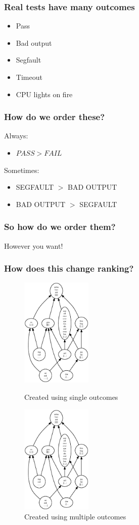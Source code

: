 \documentclass[svgnames]{beamer}
\newcommand\fail{\mathit{FAIL}}
\newcommand\pass{\mathit{PASS}}
\theoremstyle{definition}
\begin{document}
\begin{frame}
\frametitle{Real tests have many outcomes}
\begin{itemize}
\item Pass
\item Bad output
\item Segfault
\item Timeout
\item CPU lights on fire
\end{itemize}
\end{frame}

\begin{frame}
\frametitle{How do we order these?}
Always:
\begin{itemize}
\item $\pass>\fail$
\end{itemize}
Sometimes:
\begin{itemize}
\item SEGFAULT $>$ BAD OUTPUT
\item BAD OUTPUT $>$ SEGFAULT
\end{itemize}
\end{frame}

\begin{frame}
\frametitle{So how do we order them?}
However you want!
\end{frame}

\begin{frame}
\frametitle{How does this change ranking?}
\begin{figure}
\includegraphics[width=0.3\textwidth]{rank1.ps}
\caption{Created using single outcomes}

\includegraphics[width=0.3\textwidth]{rank2.ps}
\caption{Created using multiple outcomes}

\end{figure}
\end{frame}
\end{document}
